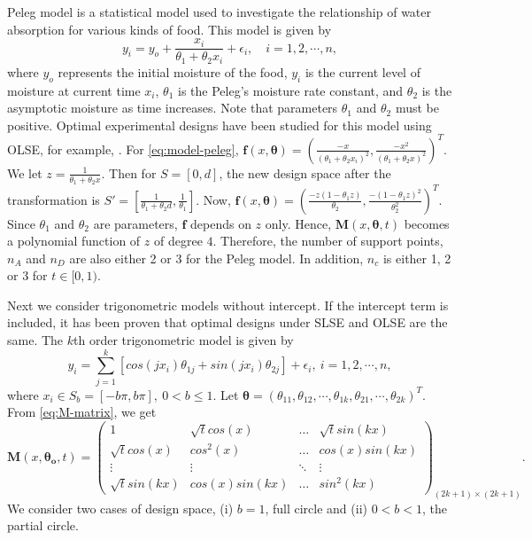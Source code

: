 \documentclass[
]{book}
\theoremstyle{definition}
\theoremstyle{definition}
\theoremstyle{definition}
\theoremstyle{definition}
\theoremstyle{remark}
\begin{document}
Peleg model is a statistical model used to investigate the relationship of water absorption for various kinds of food. This model is given by
\begin{equation} 
y_i=y_o+\frac{x_i}{\theta_1+\theta_2 x_i}+\epsilon_i,\quad i=1,2,\cdots,n,
\label{eq:model-peleg}
\end{equation}
where \(y_o\) represents the initial moisture of the food, \(y_i\) is the current level of moisture at current time \(x_i\), \(\theta_1\) is the Peleg's moisture rate constant, and \(\theta_2\) is the asymptotic moisture as time increases. Note that parameters \(\theta_1\) and \(\theta_2\) must be positive. Optimal experimental designs have been studied for this model using OLSE, for example, \citet{paquet2015optimal}. For \eqref{eq:model-peleg}, \(\boldsymbol{f}(x,\boldsymbol{\theta})=(\frac{-x}{(\theta_1+\theta_2x_i)^2},\frac{-x^2}{(\theta_1+\theta_2x)^2})^T\). We let \(z=\frac{1}{\theta_1+\theta_2x}\). Then for \(S=[0,d]\), the new design space after the transformation is \(S'=[\frac{1}{\theta_1+\theta_2d},\frac{1}{\theta_1}]\). Now, \(\boldsymbol{f}(x,\boldsymbol{\theta})=(\frac{-z(1-\theta_1z)}{\theta_2},\frac{-(1-\theta_1z)^2}{\theta_2^2})^T\). Since \(\theta_1\) and \(\theta_2\) are parameters, \(\boldsymbol{f}\) depends on \(z\) only. Hence, \(\boldsymbol{M}(x,\boldsymbol{\theta},t)\) becomes a polynomial function of \(z\) of degree \(4\). Therefore, the number of support points, \(n_A\) and \(n_D\) are also either 2 or 3 for the Peleg model. In addition, \(n_c\) is either 1, 2 or 3 for \(t\in[0,1)\).

Next we consider trigonometric models without intercept. If the intercept term is included, it has been proven that optimal designs under SLSE and OLSE are the same. The \(k\)th order trigonometric model is given by
\begin{equation} 
    y_i=\sum_{j=1}^{k}[cos(jx_i)\theta_{1j}+sin(jx_i)\theta_{2j}]+\epsilon_i,~i=1,2,\cdots,n,
    \label{eq:model-trig}
\end{equation}
where \(x_i\in S_b=[-b\pi,b\pi],~0<b\leq 1\). Let \(\boldsymbol{\theta}=(\theta_{11},\theta_{12},\cdots,\theta_{1k},\theta_{21},\cdots,\theta_{2k})^T\). From \eqref{eq:M-matrix}, we get
\begin{equation} 
\boldsymbol{M}(x,\boldsymbol{\theta_o},t)=
\begin{pmatrix}
1       &\sqrt{t}cos(x) &   \dots       &\sqrt{t}sin(kx)\\
\sqrt{t}cos(x)  &cos^2(x)   &\dots  &cos(x)sin(kx)\\
\vdots  &\vdots &   \ddots  &\vdots\\
\sqrt{t}sin(kx) &cos(x)sin(kx)&\dots    &sin^2(kx)
\end{pmatrix}_{(2k+1)\times(2k+1)}.
\label{eq:trig-M-matrix}
\end{equation}
We consider two cases of design space, (i) \(b=1\), full circle and (ii) \(0<b<1\), the partial circle.
\end{document}
